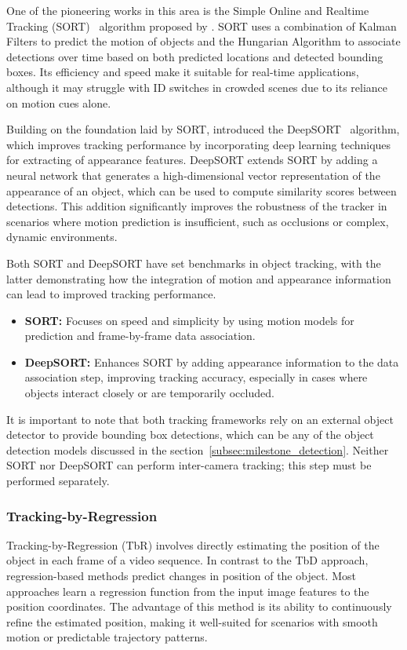 One of the pioneering works in this area is the Simple Online and Realtime Tracking (SORT)~\cite{Bewley16} algorithm proposed by \citeauthor{Bewley16}. SORT uses a combination of Kalman Filters to predict the motion of objects and the Hungarian Algorithm to associate detections over time based on both predicted locations and detected bounding boxes. Its efficiency and speed make it suitable for real-time applications, although it may struggle with ID switches in crowded scenes due to its reliance on motion cues alone.

Building on the foundation laid by SORT, \citeauthor{Wojke17} introduced the DeepSORT~\cite{Wojke17} algorithm, which improves tracking performance by incorporating deep learning techniques for extracting of appearance features. DeepSORT extends SORT by adding a neural network that generates a high-dimensional vector representation of the appearance of an object, which can be used to compute similarity scores between detections. This addition significantly improves the robustness of the tracker in scenarios where motion prediction is insufficient, such as occlusions or complex, dynamic environments.

Both SORT and DeepSORT have set benchmarks in object tracking, with the latter demonstrating how the integration of motion and appearance information can lead to improved tracking performance.

\begin{itemize}
    \item \textbf{SORT:} Focuses on speed and simplicity by using motion models for prediction and frame-by-frame data association.
    \item \textbf{DeepSORT:} Enhances SORT by adding appearance information to the data association step, improving tracking accuracy, especially in cases where objects interact closely or are temporarily occluded.
\end{itemize}

It is important to note that both tracking frameworks rely on an external object detector to provide bounding box detections, which can be any of the object detection models discussed in the section~\ref{subsec:milestone_detection}. Neither SORT nor DeepSORT can perform inter-camera tracking; this step must be performed separately.

\subsubsection{Tracking-by-Regression}\label{subsubsec:tracking-by-regression}
Tracking-by-Regression (TbR) involves directly estimating the position of the object in each frame of a video sequence. In contrast to the TbD approach, regression-based methods predict changes in position of the object. Most approaches learn a regression function from the input image features to the position coordinates. The advantage of this method is its ability to continuously refine the estimated position, making it well-suited for scenarios with smooth motion or predictable trajectory patterns.

